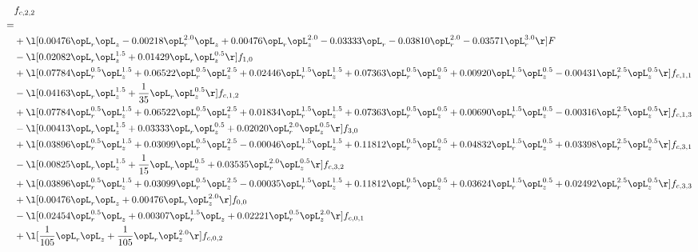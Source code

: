 \begin{alignat}{2} 
\label{eq:f_22_1} 
& f_{c,2,2} \nonumber \\ 
 = \\ 
& + \l[  0.00476 \opL_r \opL_z   -0.00218 \opL_r^{2.0} \opL_z +  0.00476 \opL_r \opL_z^{2.0}   -0.03333 \opL_r   -0.03810 \opL_r^{2.0}   -0.03571 \opL_r^{3.0}  \r] F \nonumber \\ 
& - \l[  0.02082 \opL_r \opL_z^{1.5} +  0.01429 \opL_r \opL_z^{0.5}  \r] f_{1,0} \nonumber \\ 
& + \l[  0.07784 \opL_r^{0.5} \opL_z^{1.5} +  0.06522 \opL_r^{0.5} \opL_z^{2.5} +  0.02446 \opL_r^{1.5} \opL_z^{1.5} +  0.07363 \opL_r^{0.5} \opL_z^{0.5} +  0.00920 \opL_r^{1.5} \opL_z^{0.5}   -0.00431 \opL_r^{2.5} \opL_z^{0.5}  \r] f_{c,1,1} \nonumber \\ 
& - \l[  0.04163 \opL_r \opL_z^{1.5} + \frac{1}{35} \opL_r \opL_z^{0.5}  \r] f_{c,1,2} \nonumber \\ 
& + \l[  0.07784 \opL_r^{0.5} \opL_z^{1.5} +  0.06522 \opL_r^{0.5} \opL_z^{2.5} +  0.01834 \opL_r^{1.5} \opL_z^{1.5} +  0.07363 \opL_r^{0.5} \opL_z^{0.5} +  0.00690 \opL_r^{1.5} \opL_z^{0.5}   -0.00316 \opL_r^{2.5} \opL_z^{0.5}  \r] f_{c,1,3} \nonumber \\ 
& - \l[  0.00413 \opL_r \opL_z^{1.5} +  0.03333 \opL_r \opL_z^{0.5} +  0.02020 \opL_r^{2.0} \opL_z^{0.5}  \r] f_{3,0} \nonumber \\ 
& + \l[  0.03896 \opL_r^{0.5} \opL_z^{1.5} +  0.03099 \opL_r^{0.5} \opL_z^{2.5}   -0.00046 \opL_r^{1.5} \opL_z^{1.5} +  0.11812 \opL_r^{0.5} \opL_z^{0.5} +  0.04832 \opL_r^{1.5} \opL_z^{0.5} +  0.03398 \opL_r^{2.5} \opL_z^{0.5}  \r] f_{c,3,1} \nonumber \\ 
& - \l[  0.00825 \opL_r \opL_z^{1.5} + \frac{1}{15} \opL_r \opL_z^{0.5} +  0.03535 \opL_r^{2.0} \opL_z^{0.5}  \r] f_{c,3,2} \nonumber \\ 
& + \l[  0.03896 \opL_r^{0.5} \opL_z^{1.5} +  0.03099 \opL_r^{0.5} \opL_z^{2.5}   -0.00035 \opL_r^{1.5} \opL_z^{1.5} +  0.11812 \opL_r^{0.5} \opL_z^{0.5} +  0.03624 \opL_r^{1.5} \opL_z^{0.5} +  0.02492 \opL_r^{2.5} \opL_z^{0.5}  \r] f_{c,3,3} \nonumber \\ 
& + \l[  0.00476 \opL_r \opL_z +  0.00476 \opL_r \opL_z^{2.0}  \r] f_{0,0} \nonumber \\ 
& - \l[  0.02454 \opL_r^{0.5} \opL_z +  0.00307 \opL_r^{1.5} \opL_z +  0.02221 \opL_r^{0.5} \opL_z^{2.0}  \r] f_{c,0,1} \nonumber \\ 
& + \l[ \frac{1}{105} \opL_r \opL_z + \frac{1}{105} \opL_r \opL_z^{2.0}  \r] f_{c,0,2} \nonumber \\ 

\end{alignat}
